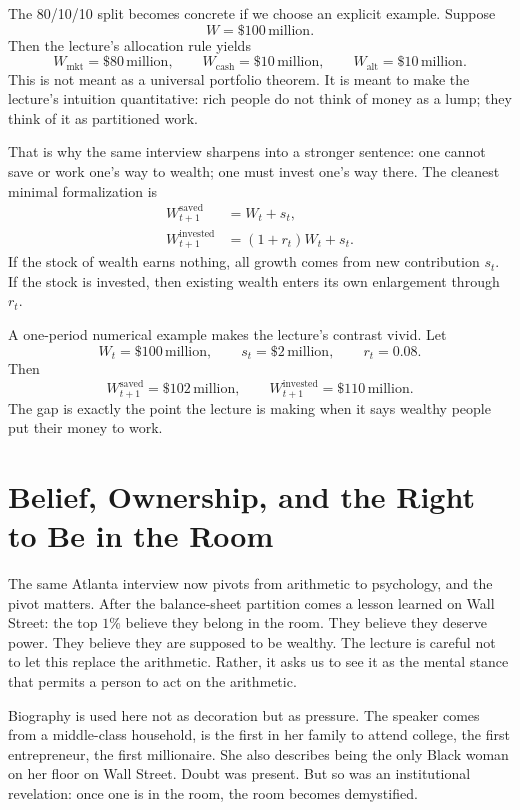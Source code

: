 The 80/10/10 split becomes concrete if we choose an explicit example. Suppose
\[
W=\$100\,\text{million}.
\]
Then the lecture's allocation rule yields
\[
W_{\mathrm{mkt}}=\$80\,\text{million},\qquad
W_{\mathrm{cash}}=\$10\,\text{million},\qquad
W_{\mathrm{alt}}=\$10\,\text{million}.
\]
This is not meant as a universal portfolio theorem. It is meant to make the lecture's intuition quantitative: rich people do not think of money as a lump; they think of it as partitioned work.

That is why the same interview sharpens into a stronger sentence: one cannot save or work one's way to wealth; one must invest one's way there. The cleanest minimal formalization is
\begin{align}
W_{t+1}^{\mathrm{saved}} &= W_t + s_t, \\
W_{t+1}^{\mathrm{invested}} &= (1+r_t)W_t + s_t.
\end{align}
If the stock of wealth earns nothing, all growth comes from new contribution \(s_t\). If the stock is invested, then existing wealth enters its own enlargement through \(r_t\).

A one-period numerical example makes the lecture's contrast vivid. Let
\[
W_t=\$100\,\text{million},\qquad s_t=\$2\,\text{million},\qquad r_t=0.08.
\]
Then
\[
W_{t+1}^{\mathrm{saved}}=\$102\,\text{million},
\qquad
W_{t+1}^{\mathrm{invested}}=\$110\,\text{million}.
\]
The gap is exactly the point the lecture is making when it says wealthy people put their money to work.

\section{Belief, Ownership, and the Right to Be in the Room}

The same Atlanta interview now pivots from arithmetic to psychology, and the pivot matters. After the balance-sheet partition comes a lesson learned on Wall Street: the top \(1\%\) believe they belong in the room. They believe they deserve power. They believe they are supposed to be wealthy. The lecture is careful not to let this replace the arithmetic. Rather, it asks us to see it as the mental stance that permits a person to act on the arithmetic.

Biography is used here not as decoration but as pressure. The speaker comes from a middle-class household, is the first in her family to attend college, the first entrepreneur, the first millionaire. She also describes being the only Black woman on her floor on Wall Street. Doubt was present. But so was an institutional revelation: once one is in the room, the room becomes demystified.

